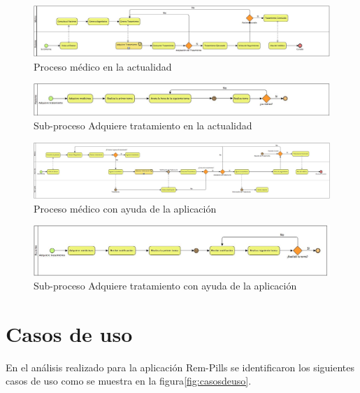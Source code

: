 \newpage
\begin{landscape}
	
\begin{figure}[htb]
	\centering
	\includegraphics[width=1.5\textwidth]{images/cap2/Proceso1}
	\caption{Proceso médico en la actualidad} \label{fig:proceso1}
\end{figure}
\newpage

\begin{figure}[htb]
	\centering
	\includegraphics[width=1.5\textwidth]{images/cap2/AdquiereTratamientoP1}
	\caption{Sub-proceso Adquiere tratamiento en la actualidad} \label{fig:subproceso1}
\end{figure}
\newpage
\begin{figure}[htb]
	\centering
	\includegraphics[width=1.5\textwidth]{images/cap2/Proceso2}
	\caption{Proceso médico con ayuda de la aplicación} \label{fig:proceso2}
\end{figure}
\newpage
\begin{figure}[htb]
	\centering
	\includegraphics[width=1.5\textwidth]{images/cap2/AdquiereTratamientoP2}
	\caption{Sub-proceso Adquiere tratamiento con ayuda de la aplicación} \label{fig:subproceso2}
\end{figure}
\end{landscape}



\section{Casos de uso}
En el análisis realizado para la aplicación Rem-Pills se identificaron los siguientes casos de uso como se muestra en la figura\ref{fig:casosdeuso}.

